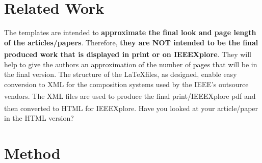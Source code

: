 \documentclass[lettersize,journal]{IEEEtran}
\begin{document}
\section{Related Work}
\noindent The templates are intended to {\bf{approximate the final look and page length of the articles/papers}}. Therefore, {\bf{they are NOT intended to be the final produced work that is displayed in print or on IEEEXplore\textsuperscript{\textregistered}}}. They will help to give the authors an approximation of the number of pages that will be in the final version. The structure of the \LaTeX files, as designed, enable easy conversion to XML for the composition systems used by the IEEE's outsource vendors. The XML files are used to produce the final print/IEEEXplore\textsuperscript{\textregistered} pdf and then converted to HTML for IEEEXplore\textsuperscript{\textregistered}. Have you looked at your article/paper in the HTML version?

\section{Method}
\end{document}

